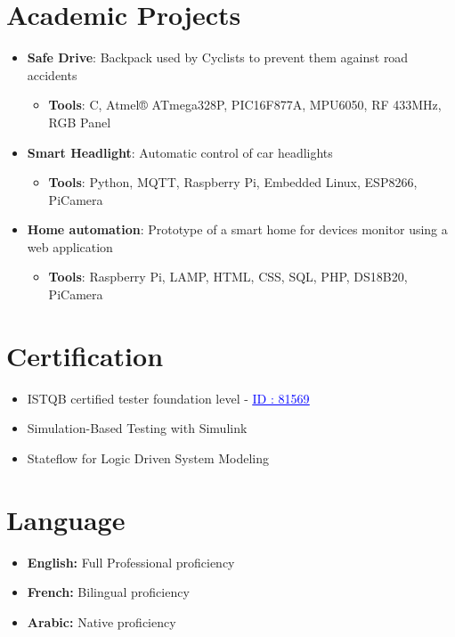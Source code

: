 \documentclass{my_cv}
\begin{document}
\section{Academic Projects}
\begin{itemize}[leftmargin=10pt, itemsep=0pt]
\item {\bf Safe Drive}:  Backpack used by Cyclists to prevent them against road accidents
\begin{itemize}\vspace{-8pt}
\item {\bf Tools}: C, Atmel® ATmega328P, PIC16F877A, MPU6050, RF 433MHz, RGB Panel
\end{itemize}
\vspace{-4pt}
\item {\bf Smart Headlight}: Automatic control of car headlights
\begin{itemize}\vspace{-8pt}
\item {\bf Tools}: Python, MQTT, Raspberry Pi, Embedded Linux, ESP8266, PiCamera
\end{itemize}
\vspace{-4pt}
\item {\bf Home automation}: Prototype of a smart home for devices monitor using a web application
\begin{itemize}\vspace{-8pt}
\item {\bf Tools}: Raspberry Pi, LAMP, HTML, CSS, SQL, PHP, DS18B20, PiCamera
\end{itemize}
\end{itemize}

\section{Certification}
	
\begin{itemize}[leftmargin=10pt, itemsep=0pt]
    \item ISTQB certified tester foundation level - \href{http://scr.istqb.org/?name=tasra&number=81569&orderBy=relevancy&orderDirection=&dateStart=&dateEnd=&expiryStart=&expiryEnd=&certificationBody=&examProvider=&certificationLevel=&country=}{\textcolor{blue}{\underline{ID : 81569}}}
 \item Simulation-Based Testing with Simulink
\item Stateflow for Logic Driven System Modeling
\end{itemize}

\section{Language}
\begin{itemize}[leftmargin=10pt, itemsep=0pt]

\item {\bf English:} Full Professional proficiency
\item {\bf French:} Bilingual proficiency
\item {\bf Arabic:} Native proficiency

\end{itemize}




\end{document}
